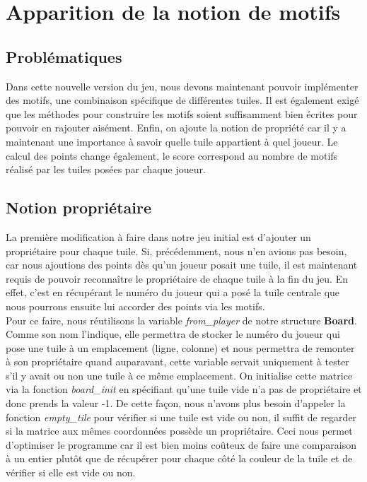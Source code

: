 \documentclass[a4paper]{article}
\begin{document}
\section{Apparition de la notion de motifs}
\subsection{Problématiques}
Dans cette nouvelle version du jeu, nous devons maintenant pouvoir implémenter des motifs, une combinaison spécifique de différentes tuiles. Il est également exigé que les méthodes pour construire les motifs soient suffisamment bien écrites pour pouvoir en rajouter aisément. Enfin, on ajoute la notion de propriété car il y a maintenant une importance à savoir quelle tuile appartient à quel joueur. Le calcul des points change également, le score correspond au nombre de motifs réalisé par les tuiles posées par chaque joueur. 

\subsection{Notion propriétaire}
La première modification à faire dans notre jeu initial est d'ajouter un propriétaire pour chaque tuile. Si, précédemment, nous n'en avions pas besoin, car nous ajoutions des points dès qu'un joueur posait une tuile, il est maintenant requis de pouvoir reconnaître le propriétaire de chaque tuile à la fin du jeu. En effet, c'est en récupérant le numéro du joueur qui a posé la tuile centrale que nous pourrons ensuite lui accorder des points via les motifs. \\

Pour ce faire, nous réutilisons la variable \emph{from\_player} de  notre structure \textbf{Board}. Comme son nom l'indique, elle permettra de stocker le numéro du joueur qui pose une tuile à un emplacement (ligne, colonne) et nous permettra de remonter à son propriétaire quand auparavant, cette variable servait uniquement à tester s'il y avait ou non une tuile à ce même emplacement. On initialise cette matrice via la fonction \emph{board\_init} en spécifiant qu'une tuile vide n'a pas de propriétaire et donc prends la valeur -1. 
De cette façon, nous n'avons plus besoin d'appeler la fonction \emph{empty\_tile} pour vérifier si une tuile est vide ou non, il suffit de regarder si la matrice aux mêmes coordonnées possède un propriétaire. Ceci nous permet d'optimiser le programme car il est bien moins coûteux de faire une comparaison à un entier plutôt que de récupérer pour chaque côté la couleur de la tuile et de vérifier si elle est vide ou non. 
\end{document}
